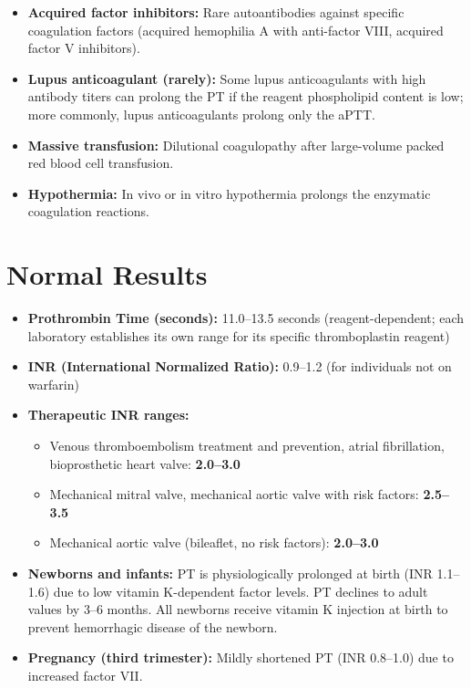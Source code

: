 \begin{itemize}
  \item \textbf{Acquired factor inhibitors:} Rare autoantibodies against specific coagulation factors (acquired hemophilia A with anti-factor VIII, acquired factor V inhibitors).
  \item \textbf{Lupus anticoagulant (rarely):} Some lupus anticoagulants with high antibody titers can prolong the PT if the reagent phospholipid content is low; more commonly, lupus anticoagulants prolong only the aPTT.
  \item \textbf{Massive transfusion:} Dilutional coagulopathy after large-volume packed red blood cell transfusion.
  \item \textbf{Hypothermia:} In vivo or in vitro hypothermia prolongs the enzymatic coagulation reactions.
\end{itemize}

\section*{Normal Results}
\begin{itemize}
  \item \textbf{Prothrombin Time (seconds):} 11.0--13.5 seconds (reagent-dependent; each laboratory establishes its own range for its specific thromboplastin reagent) \cite{wallach2022interpretation}
  \item \textbf{INR (International Normalized Ratio):} 0.9--1.2 (for individuals not on warfarin)
  \item \textbf{Therapeutic INR ranges:}
  \begin{itemize}
    \item Venous thromboembolism treatment and prevention, atrial fibrillation, bioprosthetic heart valve: \textbf{2.0--3.0}
    \item Mechanical mitral valve, mechanical aortic valve with risk factors: \textbf{2.5--3.5}
    \item Mechanical aortic valve (bileaflet, no risk factors): \textbf{2.0--3.0}
  \end{itemize}
  \item \textbf{Newborns and infants:} PT is physiologically prolonged at birth (INR 1.1--1.6) due to low vitamin K-dependent factor levels. PT declines to adult values by 3--6 months. All newborns receive vitamin K injection at birth to prevent hemorrhagic disease of the newborn.
  \item \textbf{Pregnancy (third trimester):} Mildly shortened PT (INR 0.8--1.0) due to increased factor VII.
\end{itemize}

